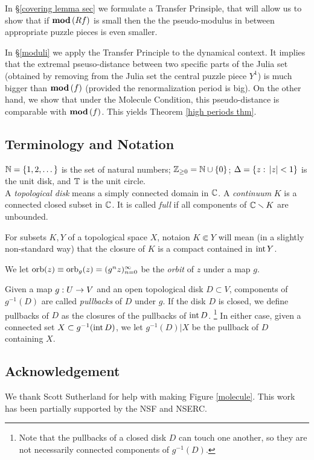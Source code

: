 In \S \ref{covering lemma sec} we formulate a Transfer Prinsiple,
that will allow us to show that if ${ \mathbf{mod}\, }(Rf)$ is small then 
the the pseudo-modulus in between appropriate puzzle pieces is even smaller.

In \S \ref{moduli} we apply the Transfer Principle to the dynamical context.
It implies that the extremal pseuso-distance between two specific parts of the Julia set 
(obtained by removing from the Julia set the central puzzle piece $Y^1$)
is  much bigger than ${ \mathbf{mod}\, }(f)$ (provided the renormalization period is big). 
On the other hand, we show that under the Molecule Condition,
this pseudo-distance is comparable with ${ \mathbf{mod}\, }(f)$. This yields Theorem \ref{high periods thm}. 
 
\subsection{Terminology and Notation}   
  ${\mathbb N} =\{1,2,\dots\}$ is the set of natural numbers; ${\mathbb Z}_{\geq 0} = {\mathbb N} \cup \{0\}$;
$\Delta=\{z:\,  |z|<1\}$ is the unit disk, and ${\mathbb T}$ is the unit circle.\\

    A  {\it topological disk} means a simply connected  domain in ${\mathbb C}$.
A {\it continuum} $K$ is a connected closed subset in ${\mathbb C}$. %
It is called {\it full} if all components of ${\mathbb C}\smallsetminus K$ are unbounded.   

For subsets $K, Y$ of a topological space $X$,   
notaion $K\Subset Y$ will mean (in a slightly non-standard way) 
that the closure  of $K$ is a compact contained in $\operatorname{int} Y$.   

  We let $\operatorname{orb}(z)\equiv \operatorname{orb}_g(z)= (g^n z)_{n=0}^\infty$ be the {\it orbit} of $z$ under a map $g$.

  Given a map $g: U\rightarrow V$ and an open topological disk $D\subset V$, 
components of $g^{-1}(D)$ are called {\it pullbacks}  of $D$ under $g$. 
If the disk $D$ is closed, we define pullbacks of $D$ as the closures of the pullbacks of $\operatorname{int} D$.%
\footnote{Note that the pullbacks of a closed disk $D$ can touch one another, 
so they are not necessarily connected components of $g^{-1}(D)$.} 
In either case, 
given a connected set $X\subset g^{-1}(\operatorname{int} D)$, we let $g^{-1} (D)|X$ be the pullback of $D$
containing $X$.    



\subsection{Acknowledgement}
We thank Scott Sutherland for help with making Figure \ref{molecule}.
This work has been partially supported by the NSF and NSERC.
